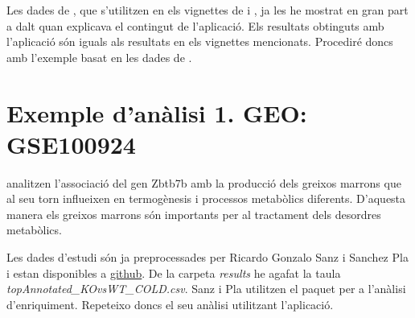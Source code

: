 Les dades de \cite{schmidt2008humoral}, que s'utilitzen en els vignettes de  i , ja les he mostrat en gran part a dalt quan explicava el contingut de l'aplicació. Els resultats obtinguts amb l'aplicació són iguals als resultats en els vignettes mencionats. Procediré doncs amb l'exemple basat en les dades de \cite{li2017zbtb7b} .

\section{Exemple d'anàlisi 1. GEO: GSE100924}

\cite{li2017zbtb7b} analitzen l'associació del gen Zbtb7b amb la producció dels greixos marrons que al seu torn influeixen en termogènesis i processos metabòlics diferents. D'aquesta manera els greixos marrons són importants per al tractament dels desordres metabòlics.

Les dades d'estudi són ja preprocessades per Ricardo Gonzalo Sanz i Sanchez Pla i estan disponibles a \href{https://github.com/alexsanchezpla/StatisticalAnalysisOfMicroarrayData}{github}. De la carpeta \textit{results} he agafat la taula \textit{topAnnotated\_KOvsWT\_COLD.csv}. Sanz i Pla utilitzen el paquet  per a l'anàlisi d'enriquiment. Repeteixo doncs el seu anàlisi utilitzant l'aplicació. 


